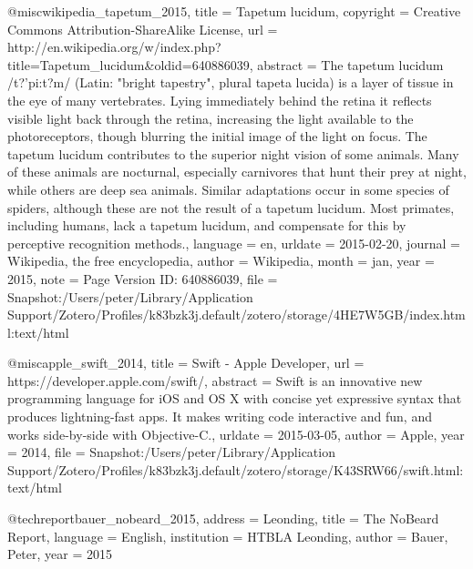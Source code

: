{@misc{wikipedia_tapetum_2015,
  title     = {Tapetum lucidum},
  copyright = {Creative Commons Attribution-ShareAlike License},
  url       = {http://en.wikipedia.org/w/index.php?title=Tapetum_lucidum&oldid=640886039},
  abstract  = {The tapetum lucidum /t?'pi:t?m/ (Latin: "bright tapestry", plural tapeta lucida) is a layer of tissue in the eye of many vertebrates. Lying immediately behind the retina it reflects visible light back through the retina, increasing the light available to the photoreceptors, though blurring the initial image of the light on focus. The tapetum lucidum contributes to the superior night vision of some animals. Many of these animals are nocturnal, especially carnivores that hunt their prey at night, while others are deep sea animals.
Similar adaptations occur in some species of spiders, although these are not the result of a tapetum lucidum. Most primates, including humans, lack a tapetum lucidum, and compensate for this by perceptive recognition methods.},
  language  = {en},
  urldate   = {2015-02-20},
  journal   = {Wikipedia, the free encyclopedia},
  author    = {{Wikipedia}},
  month     = jan,
  year      = {2015},
  note      = {Page Version ID: 640886039},
  file      = {Snapshot:/Users/peter/Library/Application Support/Zotero/Profiles/k83bzk3j.default/zotero/storage/4HE7W5GB/index.html:text/html}
}

@misc{apple_swift_2014,
  title    = {Swift - {Apple} {Developer}},
  url      = {https://developer.apple.com/swift/},
  abstract = {Swift is an innovative new programming language for iOS and OS X with concise yet expressive syntax that produces lightning-fast apps. It makes writing code interactive and fun, and works side-by-side with Objective-C.},
  urldate  = {2015-03-05},
  author   = {Apple},
  year     = {2014},
  file     = {Snapshot:/Users/peter/Library/Application Support/Zotero/Profiles/k83bzk3j.default/zotero/storage/K43SRW66/swift.html:text/html}
}

@techreport{bauer_nobeard_2015,
  address     = {Leonding},
  title       = {The {NoBeard} {Report}},
  language    = {English},
  institution = {HTBLA Leonding},
  author      = {Bauer, Peter},
  year        = {2015}
}

}
